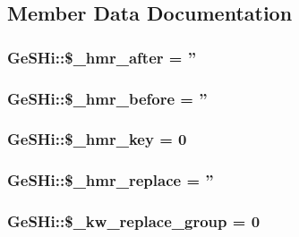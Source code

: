 \subsection{Member Data Documentation}
\hypertarget{class_ge_s_hi_a3cf085626e1a4170d8e5a0d2ee8052c7}{
\subsubsection[{\$\-\_\-hmr\-\_\-after}]{\setlength{\rightskip}{0pt plus 5cm}Ge\-S\-Hi\-::\$\-\_\-hmr\-\_\-after = ''}}\label{class_ge_s_hi_a3cf085626e1a4170d8e5a0d2ee8052c7}
\hypertarget{class_ge_s_hi_abd0763692940f0614fed05dd63a16281}{
\subsubsection[{\$\-\_\-hmr\-\_\-before}]{\setlength{\rightskip}{0pt plus 5cm}Ge\-S\-Hi\-::\$\-\_\-hmr\-\_\-before = ''}}\label{class_ge_s_hi_abd0763692940f0614fed05dd63a16281}
\hypertarget{class_ge_s_hi_a4768ed269c10f5ed9838cb34730fd315}{
\subsubsection[{\$\-\_\-hmr\-\_\-key}]{\setlength{\rightskip}{0pt plus 5cm}Ge\-S\-Hi\-::\$\-\_\-hmr\-\_\-key = 0}}\label{class_ge_s_hi_a4768ed269c10f5ed9838cb34730fd315}
\hypertarget{class_ge_s_hi_a2972dfac53d1fdfe259d535f9365630c}{
\subsubsection[{\$\-\_\-hmr\-\_\-replace}]{\setlength{\rightskip}{0pt plus 5cm}Ge\-S\-Hi\-::\$\-\_\-hmr\-\_\-replace = ''}}\label{class_ge_s_hi_a2972dfac53d1fdfe259d535f9365630c}
\hypertarget{class_ge_s_hi_a7b878506cd9e3be76fc7d5f417ea8c6a}{
\subsubsection[{\$\-\_\-kw\-\_\-replace\-\_\-group}]{\setlength{\rightskip}{0pt plus 5cm}Ge\-S\-Hi\-::\$\-\_\-kw\-\_\-replace\-\_\-group = 0}}\label{class_ge_s_hi_a7b878506cd9e3be76fc7d5f417ea8c6a}
